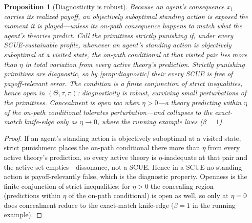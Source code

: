 \documentclass[11pt]{article}
\newtheorem{proposition}[assumption]{Proposition}
\theoremstyle{definition}
\begin{document}
\begin{proposition}[Diagnosticity is robust]
\label{prop:punishing}
Because an agent's consequence $x_i$ carries its realized payoff, an objectively suboptimal standing action is exposed the moment it is played---unless its on-path consequence happens to match what the agent's theories predict.
Call the primitives \emph{strictly punishing} if, under every SCUE-sustainable profile, whenever an agent's standing action is objectively suboptimal at a visited state, the on-path conditional at that visited pair lies more than $\eta$ in total variation from every active theory's prediction.
Strictly punishing primitives are diagnostic, so by \cref{prop:diagnostic} their every SCUE is free of payoff-relevant error.
The condition is a finite conjunction of strict inequalities, hence open in $(\Theta,\tau,\pi)$: diagnosticity is \emph{robust}, surviving small perturbations of the primitives.
Concealment is open too when $\eta>0$---a theory predicting within $\eta$ of the on-path conditional tolerates perturbation---and collapses to the exact-match knife-edge only as $\eta\to0$, where the running example lives ($\beta=1$).
\end{proposition}

\begin{proof}
If an agent's standing action is objectively suboptimal at a visited state, strict punishment places the on-path conditional there more than $\eta$ from every active theory's prediction, so every active theory is $\eta$-inadequate at that pair and the active set empties---dissonance, not a SCUE.
Hence in a SCUE no standing action is payoff-relevantly false, which is the diagnostic property.
Openness is the finite conjunction of strict inequalities; for $\eta>0$ the concealing region (predictions within $\eta$ of the on-path conditional) is open as well, so only at $\eta=0$ does concealment reduce to the exact-match knife-edge ($\beta=1$ in the running example).
\end{proof}
\end{document}

